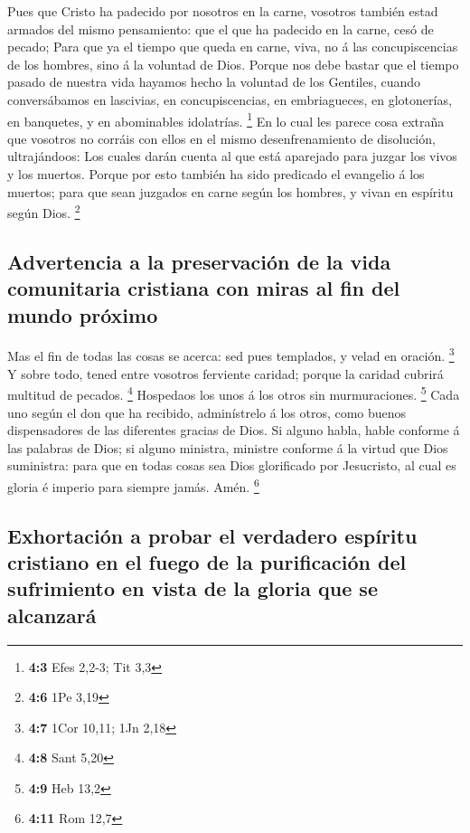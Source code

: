  Pues que Cristo ha padecido por nosotros en la carne,
vosotros también estad armados del mismo pensamiento: que el que ha
padecido en la carne, cesó de pecado;  Para que ya el
tiempo que queda en carne, viva, no á las concupiscencias de los
hombres, sino á la voluntad de Dios.  Porque nos debe
bastar que el tiempo pasado de nuestra vida hayamos hecho la voluntad de
los Gentiles, cuando conversábamos en lascivias, en concupiscencias, en
embriagueces, en glotonerías, en banquetes, y en abominables idolatrías.
\footnote{\textbf{4:3} Efes 2,2-3; Tit 3,3}  En lo cual
les parece cosa extraña que vosotros no corráis con ellos en el mismo
desenfrenamiento de disolución, ultrajándoos:  Los cuales
darán cuenta al que está aparejado para juzgar los vivos y los muertos.
 Porque por esto también ha sido predicado el evangelio á
los muertos; para que sean juzgados en carne según los hombres, y vivan
en espíritu según Dios. \footnote{\textbf{4:6} 1Pe 3,19}

\hypertarget{advertencia-a-la-preservaciuxf3n-de-la-vida-comunitaria-cristiana-con-miras-al-fin-del-mundo-pruxf3ximo}{%
\subsection{Advertencia a la preservación de la vida comunitaria
cristiana con miras al fin del mundo
próximo}\label{advertencia-a-la-preservaciuxf3n-de-la-vida-comunitaria-cristiana-con-miras-al-fin-del-mundo-pruxf3ximo}}

 Mas el fin de todas las cosas se acerca: sed pues
templados, y velad en oración. \footnote{\textbf{4:7} 1Cor 10,11; 1Jn
  2,18}  Y sobre todo, tened entre vosotros ferviente
caridad; porque la caridad cubrirá multitud de pecados. \footnote{\textbf{4:8}
  Sant 5,20}  Hospedaos los unos á los otros sin
murmuraciones. \footnote{\textbf{4:9} Heb 13,2}  Cada uno
según el don que ha recibido, adminístrelo á los otros, como buenos
dispensadores de las diferentes gracias de Dios.  Si
alguno habla, hable conforme á las palabras de Dios; si alguno ministra,
ministre conforme á la virtud que Dios suministra: para que en todas
cosas sea Dios glorificado por Jesucristo, al cual es gloria é imperio
para siempre jamás. Amén. \footnote{\textbf{4:11} Rom 12,7}

\hypertarget{exhortaciuxf3n-a-probar-el-verdadero-espuxedritu-cristiano-en-el-fuego-de-la-purificaciuxf3n-del-sufrimiento-en-vista-de-la-gloria-que-se-alcanzaruxe1}{%
\subsection{Exhortación a probar el verdadero espíritu cristiano en el
fuego de la purificación del sufrimiento en vista de la gloria que se
alcanzará}\label{exhortaciuxf3n-a-probar-el-verdadero-espuxedritu-cristiano-en-el-fuego-de-la-purificaciuxf3n-del-sufrimiento-en-vista-de-la-gloria-que-se-alcanzaruxe1}}

